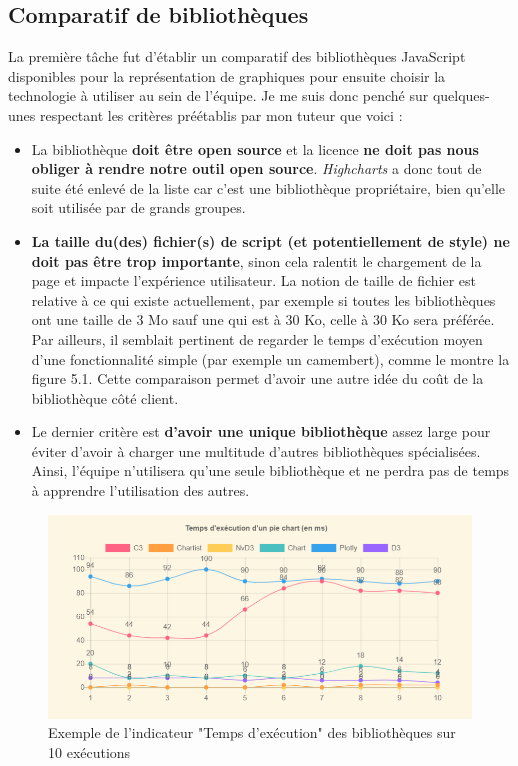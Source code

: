 \subsection{Comparatif de bibliothèques}
\label{comp_bibliotheques}
La première tâche fut d'établir un comparatif des bibliothèques JavaScript disponibles pour la représentation de graphiques pour ensuite choisir la technologie à utiliser au sein de l'équipe. Je me suis donc penché sur quelques-unes respectant les critères préétablis par mon tuteur que voici :
\begin{itemize}
\item La bibliothèque \textbf{doit être open source} et la licence \textbf{ne doit pas nous obliger à rendre notre outil open source}. \textit{Highcharts} a donc tout de suite été enlevé de la liste car c'est une bibliothèque propriétaire, bien qu'elle soit utilisée par de grands groupes.
\item \textbf{La taille du(des) fichier(s) de script (et potentiellement de style) ne doit pas être trop importante}, sinon cela ralentit le chargement de la page et impacte l'expérience utilisateur. La notion de taille de fichier est relative à ce qui existe actuellement, par exemple si toutes les bibliothèques ont une taille de 3 Mo sauf une qui est à 30 Ko, celle à 30 Ko sera préférée. Par ailleurs, il semblait pertinent de regarder le temps d'exécution moyen d'une fonctionnalité simple (par exemple un camembert), comme le montre la figure 5.1. Cette comparaison permet d'avoir une autre idée du coût de la bibliothèque côté client.
\item Le dernier critère est \textbf{d'avoir une unique bibliothèque} assez large pour éviter d'avoir à charger une multitude d'autres bibliothèques spécialisées. Ainsi, l'équipe n'utilisera qu'une seule bibliothèque et ne perdra pas de temps à apprendre l'utilisation des autres.
\end{itemize}
\bigskip

\begin{figure}
\begin{center}
\includegraphics[scale=0.8]{resources/benchmark.png}
\caption{Exemple de l'indicateur "Temps d'exécution" des bibliothèques sur 10 exécutions}
\end{center}
\end{figure}


